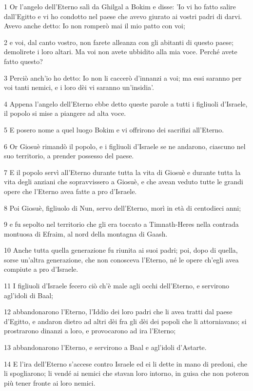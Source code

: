 \par 1 Or l'angelo dell'Eterno salì da Ghilgal a Bokim e disse: 'Io vi ho fatto salire dall'Egitto e vi ho condotto nel paese che avevo giurato ai vostri padri di darvi. Avevo anche detto: Io non romperò mai il mio patto con voi;
\par 2 e voi, dal canto vostro, non farete alleanza con gli abitanti di questo paese; demolirete i loro altari. Ma voi non avete ubbidito alla mia voce. Perché avete fatto questo?
\par 3 Perciò anch'io ho detto: Io non li caccerò d'innanzi a voi; ma essi saranno per voi tanti nemici, e i loro dèi vi saranno un'insidia'.
\par 4 Appena l'angelo dell'Eterno ebbe detto queste parole a tutti i figliuoli d'Israele, il popolo si mise a piangere ad alta voce.
\par 5 E posero nome a quel luogo Bokim e vi offrirono dei sacrifizi all'Eterno.
\par 6 Or Giosuè rimandò il popolo, e i figliuoli d'Israele se ne andarono, ciascuno nel suo territorio, a prender possesso del paese.
\par 7 E il popolo servì all'Eterno durante tutta la vita di Giosuè e durante tutta la vita degli anziani che sopravvissero a Giosuè, e che avean veduto tutte le grandi opere che l'Eterno avea fatte a pro d'Israele.
\par 8 Poi Giosuè, figliuolo di Nun, servo dell'Eterno, morì in età di centodieci anni;
\par 9 e fu sepolto nel territorio che gli era toccato a Timnath-Heres nella contrada montuosa di Efraim, al nord della montagna di Gaash.
\par 10 Anche tutta quella generazione fu riunita ai suoi padri; poi, dopo di quella, sorse un'altra generazione, che non conosceva l'Eterno, né le opere ch'egli avea compiute a pro d'Israele.
\par 11 I figliuoli d'Israele fecero ciò ch'è male agli occhi dell'Eterno, e servirono agl'idoli di Baal;
\par 12 abbandonarono l'Eterno, l'Iddio dei loro padri che li avea tratti dal paese d'Egitto, e andaron dietro ad altri dèi fra gli dèi dei popoli che li attorniavano; si prostrarono dinanzi a loro, e provocarono ad ira l'Eterno;
\par 13 abbandonarono l'Eterno, e servirono a Baal e agl'idoli d'Astarte.
\par 14 E l'ira dell'Eterno s'accese contro Israele ed ei li dette in mano di predoni, che li spogliarono; li vendé ai nemici che stavan loro intorno, in guisa che non poteron più tener fronte ai loro nemici.
